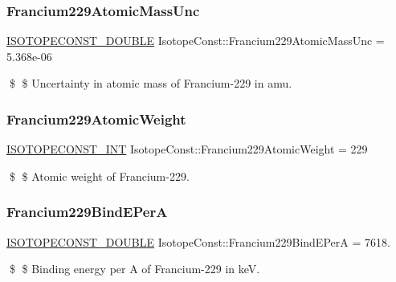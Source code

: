 \subsubsection{\texorpdfstring{Francium229\+Atomic\+Mass\+Unc}{Francium229AtomicMassUnc}}
{\footnotesize\ttfamily \mbox{\hyperlink{group___isotope_const-_macros_ga8f45a7272ce02c0b4c65c44636ed719a}{I\+S\+O\+T\+O\+P\+E\+C\+O\+N\+S\+T\+\_\+\+D\+O\+U\+B\+LE}} Isotope\+Const\+::\+Francium229\+Atomic\+Mass\+Unc = 5.\+368e-\/06}

\$ \$ Uncertainty in atomic mass of Francium-\/229 in amu. \mbox{\label{group___isotope_const-_francium-_fr229_gaac32cd902cb7a07cd924bee2cec8d304}} 
\subsubsection{\texorpdfstring{Francium229\+Atomic\+Weight}{Francium229AtomicWeight}}
{\footnotesize\ttfamily \mbox{\hyperlink{group___isotope_const-_macros_ga5f18360b3e99483a35c32d789e62621c}{I\+S\+O\+T\+O\+P\+E\+C\+O\+N\+S\+T\+\_\+\+I\+NT}} Isotope\+Const\+::\+Francium229\+Atomic\+Weight = 229}

\$ \$ Atomic weight of Francium-\/229. \mbox{\label{group___isotope_const-_francium-_fr229_gabc95be4752045c806048b1bc4674ff9d}} 
\subsubsection{\texorpdfstring{Francium229\+Bind\+E\+PerA}{Francium229BindEPerA}}
{\footnotesize\ttfamily \mbox{\hyperlink{group___isotope_const-_macros_ga8f45a7272ce02c0b4c65c44636ed719a}{I\+S\+O\+T\+O\+P\+E\+C\+O\+N\+S\+T\+\_\+\+D\+O\+U\+B\+LE}} Isotope\+Const\+::\+Francium229\+Bind\+E\+PerA = 7618.}

\$ \$ Binding energy per A of Francium-\/229 in keV. \mbox{\label{group___isotope_const-_francium-_fr229_ga0c8adec2f9054430fe910e3b9d6d097e}} 
